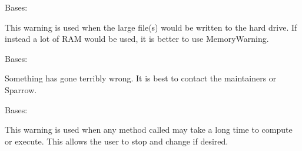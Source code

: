 \documentclass[letterpaper,10pt,english]{sphinxmanual}
\begin{document}

\begin{fulllineitems}
\label{\detokenize{python_docstrings/IfA_Smeargle.meta.errors:IfA_Smeargle.meta.errors.StorageWarning}}
Bases: {\hyperref[\detokenize{python_docstrings/IfA_Smeargle.meta.errors:IfA_Smeargle.meta.errors.Smeargle_Warning}]{}}

This warning is used when the large file(s) would be written to the hard
drive. If instead a lot of RAM would be used, it is better to use
MemoryWarning.

\end{fulllineitems}


\begin{fulllineitems}
\label{\detokenize{python_docstrings/IfA_Smeargle.meta.errors:IfA_Smeargle.meta.errors.TerminalError}}
Bases: {\hyperref[\detokenize{python_docstrings/IfA_Smeargle.meta.errors:IfA_Smeargle.meta.errors.Smeargle_BaseException}]{}}

Something has gone terribly wrong. It is best to contact the maintainers
or Sparrow.

\end{fulllineitems}


\begin{fulllineitems}
\label{\detokenize{python_docstrings/IfA_Smeargle.meta.errors:IfA_Smeargle.meta.errors.TimeWarning}}
Bases: {\hyperref[\detokenize{python_docstrings/IfA_Smeargle.meta.errors:IfA_Smeargle.meta.errors.Smeargle_Warning}]{}}

This warning is used when any method called may take a long time to
compute or execute. This allows the user to stop and change if desired.

\end{fulllineitems}
\end{document}
